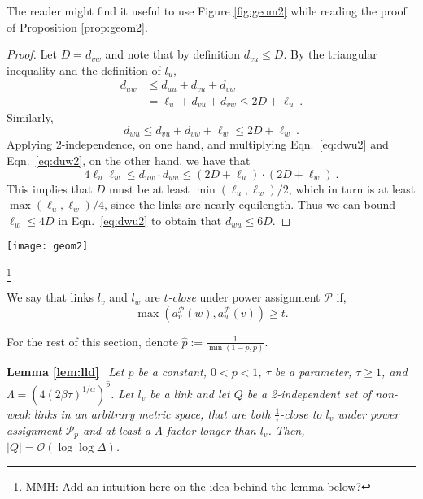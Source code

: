 \documentclass[11pt]{amsart}
\newcommand{\cal}[1]{\mathcal{#1}}
\newcommand{\BO}{\mathcal{O}}
\def\calP{{\cal P}}
\def\calP{{\cal P}}   \def\calM{{\cal M}}   \def\calU{{\cal U}}   \newcommand{\PCopt}{\overline{OPT}}
\newcommand{\powp}{\calP_p}
\begin{document}
The reader might find it useful to use Figure \ref{fig:geom2} while reading the proof of Proposition \ref{prop:geom2}.


\begin{proof}
Let $D = d_{vw}$ and note that by definition $d_{vu} \le D$.
By the triangular inequality and the definition of $l_u$, 
\begin{align}
 d_{uw} &\le d_{uu} + d_{vu} + d_{vw}
 \nonumber\\
 & = \ell_u + d_{vu} + d_{vw} 
       \le 2 D + \ell_u\ . 
\label{eq:duw2}
\end{align}
Similarly, 
\begin{equation}
 d_{wu} \le d_{vu} + d_{vw} + \ell_w \le 2 D + \ell_w \ .
\label{eq:dwu2}
\end{equation}
Applying 2-independence, on one hand, and multiplying Eqn.\ \ref{eq:dwu2} and Eqn.\ \ref{eq:duw2}, on the other hand, we have that
\[ 4 \ell_u \ell_w \le d_{uw} \cdot d_{wu} \leq (2D + \ell_u) \cdot (2 D + \ell_w) \ . \]
This implies that $D$ must be at least $\min(\ell_u, \ell_w)/2$, which in turn is at least $\max(\ell_u, \ell_w)/4$, since the links are nearly-equilength.
Thus we can bound $\ell_w\leq 4D$ in Eqn.\ \ref{eq:dwu2} to obtain that $d_{wu}\leq 6D$.
\end{proof}
\begin{figure*}[ht]
	\begin{center}
		\texttt{[image: geom2]}
	\end{center}
	\caption{Links $l_u,l_w$ and $l_w$ as used in the proofs of Propositions \ref{prop:geom1} and \ref{prop:geom2}. The distances $d_{vw}$ and $d_{wu}$ that are related to each other in the Proposition's statement are represented by red dotted lines. The gray dashed lines mark distances $d_{uw}$ and $d_{vu}$ that are used in the proofs as well.}\label{fig:geom2}
\end{figure*}

\footnote{MMH: Add an intuition here on the idea behind the lemma below?}

\begin{defn}
We say that links $l_v$ and $l_w$ are \emph{$t$-close} under
power assignment $\calP$ if, \[\max(a_{v}^\calP(w),a_{w}^\calP(v)) \ge t.\]
\end{defn}

For the rest of this section, denote $\hat{p} := \frac{1}{\min(1-p,p)}$.

\smallskip

\noindent \textbf{Lemma \ref{lem:lld}}\ 
\emph{
Let $p$ be a constant, $0 < p < 1$, $\tau$ be a parameter, $\tau \ge 1$, and $\Lambda =
(4 (2\beta \tau)^{1/\alpha})^{\hat{p}}$. 
Let $l_v$ be a link and 
let $Q$ be a 2-independent set of non-weak links in an arbitrary
metric space, that are both $\frac{1}{\tau}$-close to $l_v$
under power assignment $\powp$ and at least a $\Lambda$-factor longer than $l_v$.
Then, $|Q| = \BO(\log\log \Delta)$.
}
\smallskip
\end{document}
